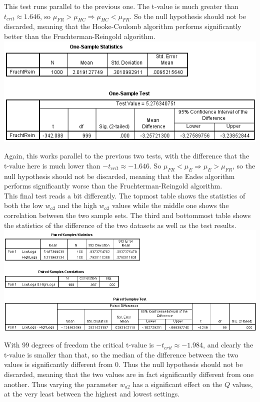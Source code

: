 \documentclass[a4paper,12pt]{article}
\begin{document}
  This test runs parallel to the previous one. The t-value is much greater than $t_{crit} \approx 1.646$, so $\mu_{FR} > \mu_{HC} \Rightarrow \mu_{HC} < \mu_{FR}$. So the null hypothesis should not be discarded, meaning that the Hooke-Coulomb algorithm performs significantly better than the Fruchterman-Reingold algorithm. \\
  \includegraphics{EadesFRTest}
  
  Again, this works parallel to the previous two tests, with the difference that the t-value here is much lower than $-t_{crit} \approx -1.646$. So $\mu_{FR} < \mu_{E} \Rightarrow \mu_{E} > \mu_{FR}$, so the null hypothesis should not be discarded, meaning that the Eades algorithm performs significantly worse than the Fruchterman-Reingold algorithm. \\
  
  This final test reads a bit differently. The topmost table shows the statistics of both the low $w_{a2}$ and the high $w_{a2}$ values while the middle one shows the correlation between the two sample sets. The third and bottommost table shows the statistics of the difference of the two datasets as well as the test results. \\
  \includegraphics[width=450pt]{LogPairedTest}
  
  With 99 degrees of freedom the critical t-value is $-t_{crit} \approx -1.984$, and clearly the t-value is smaller than that, so the median of the difference between the two values is significantly different from 0. Thus the null hypothesis should not be discarded, meaning that the two values are in fact significantly different from one another. Thus varying the parameter $w_{a2}$ has a significant effect on the $Q$ values, at the very least between the highest and lowest settings. 
\end{document}

